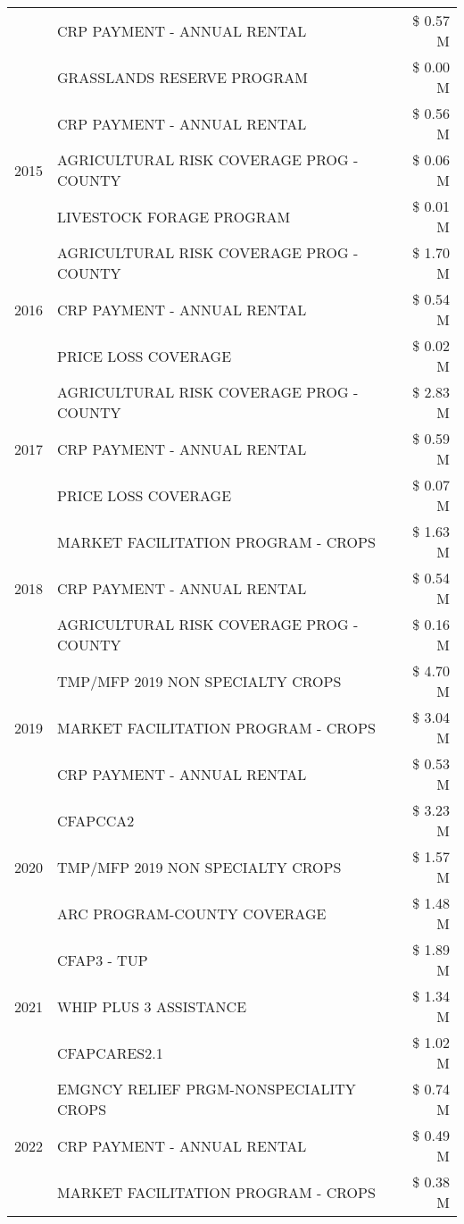 \begin{tabular}{llr}
 & CRP PAYMENT - ANNUAL RENTAL & \$ 0.57 M \\
 & GRASSLANDS RESERVE PROGRAM & \$ 0.00 M \\
\cline{1-3}
\multirow[t]{3}{*}{2015} & CRP PAYMENT - ANNUAL RENTAL & \$ 0.56 M \\
 & AGRICULTURAL RISK COVERAGE PROG - COUNTY & \$ 0.06 M \\
 & LIVESTOCK FORAGE PROGRAM & \$ 0.01 M \\
\cline{1-3}
\multirow[t]{3}{*}{2016} & AGRICULTURAL RISK COVERAGE PROG - COUNTY & \$ 1.70 M \\
 & CRP PAYMENT - ANNUAL RENTAL & \$ 0.54 M \\
 & PRICE LOSS COVERAGE & \$ 0.02 M \\
\cline{1-3}
\multirow[t]{3}{*}{2017} & AGRICULTURAL RISK COVERAGE PROG - COUNTY & \$ 2.83 M \\
 & CRP PAYMENT - ANNUAL RENTAL & \$ 0.59 M \\
 & PRICE LOSS COVERAGE & \$ 0.07 M \\
\cline{1-3}
\multirow[t]{3}{*}{2018} & MARKET FACILITATION PROGRAM - CROPS & \$ 1.63 M \\
 & CRP PAYMENT - ANNUAL RENTAL & \$ 0.54 M \\
 & AGRICULTURAL RISK COVERAGE PROG - COUNTY & \$ 0.16 M \\
\cline{1-3}
\multirow[t]{3}{*}{2019} & TMP/MFP 2019 NON SPECIALTY CROPS & \$ 4.70 M \\
 & MARKET FACILITATION PROGRAM - CROPS & \$ 3.04 M \\
 & CRP PAYMENT - ANNUAL RENTAL & \$ 0.53 M \\
\cline{1-3}
\multirow[t]{3}{*}{2020} & CFAPCCA2 & \$ 3.23 M \\
 & TMP/MFP 2019 NON SPECIALTY CROPS & \$ 1.57 M \\
 & ARC PROGRAM-COUNTY COVERAGE & \$ 1.48 M \\
\cline{1-3}
\multirow[t]{3}{*}{2021} & CFAP3 - TUP & \$ 1.89 M \\
 & WHIP PLUS 3 ASSISTANCE & \$ 1.34 M \\
 & CFAPCARES2.1 & \$ 1.02 M \\
\cline{1-3}
\multirow[t]{3}{*}{2022} & EMGNCY RELIEF PRGM-NONSPECIALITY CROPS & \$ 0.74 M \\
 & CRP PAYMENT - ANNUAL RENTAL & \$ 0.49 M \\
 & MARKET FACILITATION PROGRAM - CROPS & \$ 0.38 M \\
\cline{1-3}
\bottomrule
\end{tabular}
